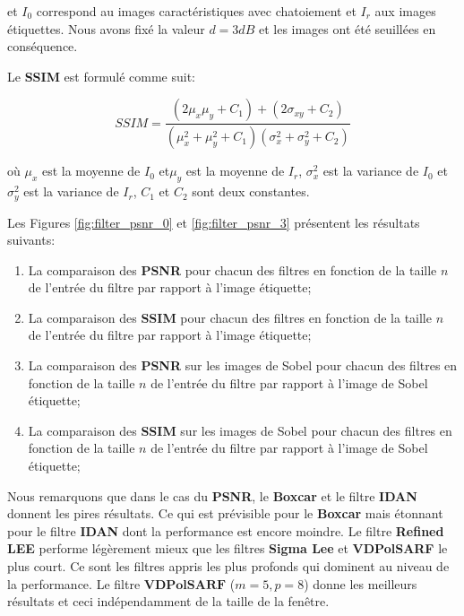 et $I_0$ correspond au images caractéristiques avec chatoiement et $I_r$ aux images étiquettes.  Nous avons fixé la valeur $d=3 dB$ et les images ont été seuillées en conséquence.

Le \textbf{SSIM} est formulé comme suit:

\begin{equation}
  SSIM = \frac{(2\mu_x\mu_y + C_1) + (2 \sigma _{xy} + C_2)} 
    {(\mu_x^2 + \mu_y^2+C_1) (\sigma_x^2 + \sigma_y^2+C_2)}
  \label{eq:SSMI}
\end{equation}

où $\mu_x$ est la moyenne de $I_0$ et$\mu_y$ est la moyenne de $I_r$, $\sigma_x^2$ est la variance de $I_0$ et $\sigma_y^2$ est la variance de $I_r$, $C_1$ et $C_2$ sont deux constantes.

Les Figures \ref{fig:filter_psnr_0} et \ref{fig:filter_psnr_3}  présentent les résultats suivants:

\begin{enumerate}
    \item La comparaison des \textbf{PSNR} pour chacun des filtres en fonction de la taille $n$ de l'entrée du filtre par rapport à l'image étiquette;
    \item La comparaison des \textbf{SSIM} pour chacun des filtres en fonction de la taille $n$ de l'entrée du filtre par rapport à l'image étiquette;
    \item La comparaison des \textbf{PSNR} sur les images de Sobel pour chacun des filtres en fonction de la taille $n$ de l'entrée du filtre par rapport à l'image de Sobel étiquette;
    \item La comparaison des \textbf{SSIM} sur les images de Sobel pour chacun des filtres en fonction de la taille $n$ de l'entrée du filtre par rapport à l'image de Sobel étiquette;
\end{enumerate}

Nous remarquons que dans le cas du \textbf{PSNR}, le \textbf{Boxcar} et le filtre \textbf{IDAN} donnent les pires résultats. Ce qui est prévisible pour le \textbf{Boxcar} mais étonnant pour le filtre \textbf{IDAN} dont la performance est encore moindre.  Le filtre \textbf{Refined LEE} performe légèrement mieux que les filtres \textbf{Sigma Lee} et \textbf{VDPolSARF} le plus court. Ce sont les filtres appris les plus profonds qui dominent au niveau de la performance.  Le filtre $\textbf{VDPolSARF}$ ($m=5, p=8$) donne les meilleurs résultats et ceci indépendamment de la taille de la fenêtre.


